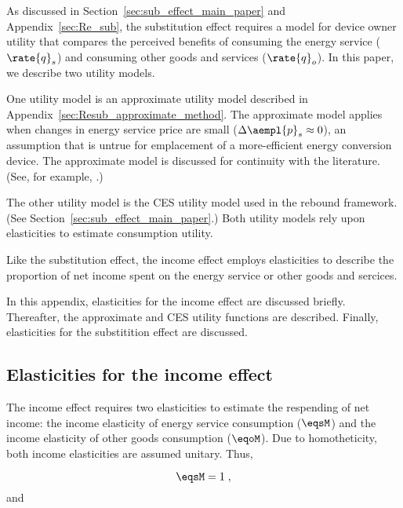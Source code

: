 

As discussed in Section~\ref{sec:sub_effect_main_paper}
and Appendix~\ref{sec:Re_sub}, 
the substitution effect requires a model for device owner utility
that compares the perceived benefits of 
consuming the energy service ($\rate{q}_s$) and
consuming other goods and services ($\rate{q}_o$).
In this paper, we describe two utility models.

One utility model is an approximate utility model
described in Appendix~\ref{sec:Resub_approximate_method}.
The approximate model applies when
changes in energy service price are small ($\Delta \aempl{p}_s \approx 0$), 
an assumption that is untrue for emplacement of a more-efficient energy conversion device.
The approximate model is discussed for continuity with the literature.
(See, for example, \citet{Borenstein:2015aa}.)

The other utility model is the CES utility model used in the rebound framework.
(See Section~\ref{sec:sub_effect_main_paper}.)
Both utility models rely upon elasticities to estimate consumption utility.

Like the substitution effect,
the income effect employs elasticities
to describe the proportion of net income spent on the energy service
or other goods and sercices.

In this appendix,
elasticities for the income effect are discussed briefly. 
Thereafter, the approximate and CES utility functions are described.
Finally, elasticities for the substitition effect are 
discussed.


\subsection{Elasticities for the income effect}
\label{sec:income_elasticities}

The income effect requires two elasticities to 
estimate the respending of net income:
the income elasticity of energy service consumption ($\eqsM$) and
the income elasticity of other goods consumption ($\eqoM$).
Due to homotheticity,
both income elasticities are assumed unitary. 
Thus, 

\begin{equation} \label{eq:eqsM}
  \eqsM = 1 \; ,
\end{equation}
%
and

